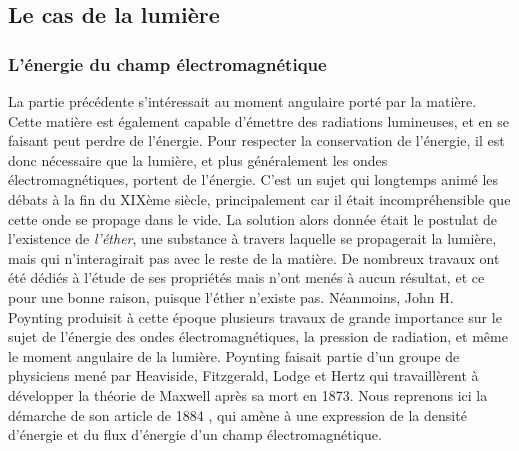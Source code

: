\subsection{Le cas de la lumière}
\subsubsection{L'énergie du champ électromagnétique}
La partie précédente s'intéressait au moment angulaire porté par la matière. Cette matière est également capable d'émettre des radiations lumineuses, et en se faisant peut perdre de l'énergie. Pour respecter la conservation de l'énergie, il est donc nécessaire que la lumière, et plus généralement les ondes électromagnétiques, portent de l'énergie. C'est un sujet qui longtemps animé les débats à la fin du XIXème siècle, principalement car il était incompréhensible que cette onde se propage dans le vide. La solution alors donnée était le postulat de l'existence de \textit{l'éther}, une substance à travers laquelle se propagerait la lumière, mais qui n’interagirait pas avec le reste de la matière. De nombreux travaux ont été dédiés à l'étude de ses propriétés mais n'ont menés à aucun résultat, et ce pour une bonne raison, puisque l'éther n'existe pas. Néanmoins, John H. Poynting produisit à cette époque plusieurs travaux de grande importance sur le sujet de l'énergie des ondes électromagnétiques, la pression de radiation, et même le moment angulaire de la lumière. Poynting faisait partie d'un groupe de physiciens mené par Heaviside, Fitzgerald, Lodge et Hertz qui travaillèrent à développer la théorie de Maxwell après sa mort en 1873. Nous reprenons ici la démarche de son article de 1884 , qui amène à une expression de la densité d'énergie et du flux d'énergie d'un champ électromagnétique.

